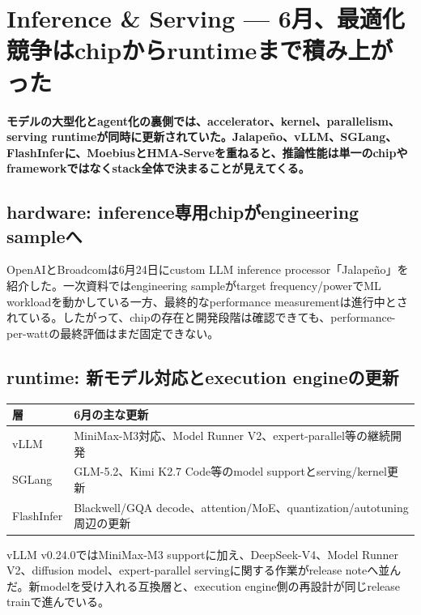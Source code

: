 \section{Inference \& Serving — 6月、最適化競争はchipからruntimeまで積み上がった}
\label{pkg:inference-serving-june}
\noindent\textbf{モデルの大型化とagent化の裏側では、accelerator、kernel、parallelism、serving runtimeが同時に更新されていた。Jalapeño、vLLM、SGLang、FlashInferに、MoebiusとHMA-Serveを重ねると、推論性能は単一のchipやframeworkではなくstack全体で決まることが見えてくる。}\autocite{src-272a6dac5bcc,src-43606e2afafd,src-538cecdad845,src-6cc910fb0183,src-855db08b75f6,src-a66d76643eee}

\subsection{hardware: inference専用chipがengineering sampleへ}

OpenAIとBroadcomは6月24日にcustom LLM inference processor「Jalapeño」を紹介した。一次資料ではengineering sampleがtarget frequency/powerでML workloadを動かしている一方、最終的なperformance measurementは進行中とされている。したがって、chipの存在と開発段階は確認できても、performance-per-wattの最終評価はまだ固定できない。\autocite{src-855db08b75f6}


\subsection{runtime: 新モデル対応とexecution engineの更新}

\begin{center}
\small
\begin{tabularx}{\columnwidth}{>{\raggedright\arraybackslash}X|>{\raggedright\arraybackslash}X}
\toprule
\textbf{層} & \textbf{6月の主な更新} \\
\midrule
vLLM & MiniMax-M3対応、Model Runner V2、expert-parallel等の継続開発 \\
SGLang & GLM-5.2、Kimi K2.7 Code等のmodel supportとserving/kernel更新 \\
FlashInfer & Blackwell/GQA decode、attention/MoE、quantization/autotuning周辺の更新 \\
\bottomrule
\end{tabularx}
\autocite{src-272a6dac5bcc,src-538cecdad845,src-6cc910fb0183}
\end{center}

vLLM v0.24.0ではMiniMax-M3 supportに加え、DeepSeek-V4、Model Runner V2、diffusion model、expert-parallel servingに関する作業がrelease noteへ並んだ。新modelを受け入れる互換層と、execution engine側の再設計が同じrelease trainで進んでいる。\autocite{src-6cc910fb0183}


